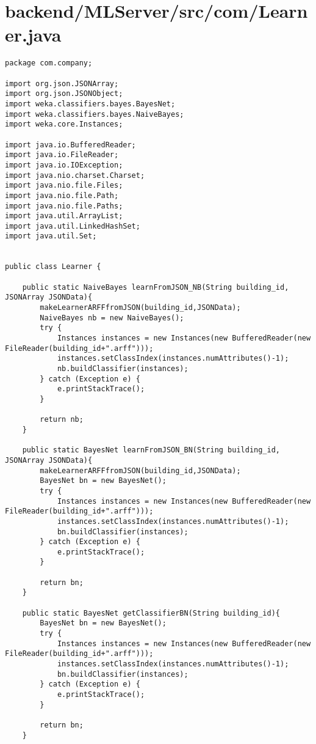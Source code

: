 \section{backend/MLServer/src/com/Learner.java}
\begin{lstlisting}package com.company;

import org.json.JSONArray;
import org.json.JSONObject;
import weka.classifiers.bayes.BayesNet;
import weka.classifiers.bayes.NaiveBayes;
import weka.core.Instances;

import java.io.BufferedReader;
import java.io.FileReader;
import java.io.IOException;
import java.nio.charset.Charset;
import java.nio.file.Files;
import java.nio.file.Path;
import java.nio.file.Paths;
import java.util.ArrayList;
import java.util.LinkedHashSet;
import java.util.Set;


public class Learner {

    public static NaiveBayes learnFromJSON_NB(String building_id, JSONArray JSONData){
        makeLearnerARFFfromJSON(building_id,JSONData);
        NaiveBayes nb = new NaiveBayes();
        try {
            Instances instances = new Instances(new BufferedReader(new FileReader(building_id+".arff")));
            instances.setClassIndex(instances.numAttributes()-1);
            nb.buildClassifier(instances);
        } catch (Exception e) {
            e.printStackTrace();
        }

        return nb;
    }

    public static BayesNet learnFromJSON_BN(String building_id, JSONArray JSONData){
        makeLearnerARFFfromJSON(building_id,JSONData);
        BayesNet bn = new BayesNet();
        try {
            Instances instances = new Instances(new BufferedReader(new FileReader(building_id+".arff")));
            instances.setClassIndex(instances.numAttributes()-1);
            bn.buildClassifier(instances);
        } catch (Exception e) {
            e.printStackTrace();
        }

        return bn;
    }

    public static BayesNet getClassifierBN(String building_id){
        BayesNet bn = new BayesNet();
        try {
            Instances instances = new Instances(new BufferedReader(new FileReader(building_id+".arff")));
            instances.setClassIndex(instances.numAttributes()-1);
            bn.buildClassifier(instances);
        } catch (Exception e) {
            e.printStackTrace();
        }

        return bn;
    }


\end{lstlisting}
